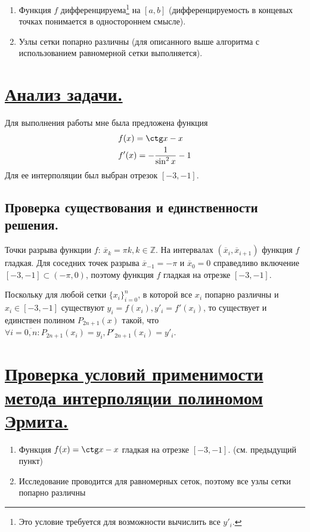 \documentclass[a4paper, 12pt]{article}
\begin{document}
	\begin{enumerate}
		\item Функция $f$ дифференцируема\footnote{Это условие требуется для возможности вычислить все $y'_i$.} на $[a,b]$ (дифференцируемость в концевых точках понимается в одностороннем смысле).
		\item Узлы сетки попарно различны (для описанного выше алгоритма с использованием равномерной сетки выполняется).
	\end{enumerate}

	\section{\underline{Анализ задачи.}}
	
	Для выполнения работы мне была предложена функция
	\begin{equation}
		\begin{aligned}
				&f(x)=\ctg x - x\\
			&f'(x)=-\frac{1}{\sin^2x}-1
		\end{aligned}
	\end{equation}
	Для ее интерполяции был выбран отрезок $[-3,-1]$.
	
	\subsection{Проверка существования и единственности решения.}
	
	Точки разрыва функции $f$: $\overline{x}_k=\pi k,k\in\mathbb{Z}$. На интервалах $(\overline{x}_{i}, \overline{x}_{i+1})$ функция $f$ гладкая. Для соседних точек разрыва $\overline{x}_{-1}=-\pi$ и $\overline{x}_{0}=0$ справедливо включение $[-3,-1]\subset(-\pi,0)$, поэтому функция $f$ гладкая на отрезке $[-3,-1]$.
	
	Поскольку для любой сетки $\{x_i\}_{i=0}^n$, в которой все $x_i$ попарно различны и $x_i\in[-3,-1]$ существуют $y_i=f(x_i), y'_i=f'(x_i)$, то существует и единствен полином $P_{2n+1}(x)$ такой, что $\forall i=\overline{0,n} : P_{2n+1}(x_i)=y_i, P'_{2n+1}(x_i) =y'_i$.
	
	\section{\underline{Проверка условий применимости метода интерполяции полиномом Эрмита.}}
	
	\begin{enumerate}
		\item Функция $f(x)=\ctg x - x$ гладкая на отрезке $[-3,-1]$. (см. предыдущий пункт)
		\item Исследование проводится для равномерных сеток, поэтому все узлы сетки попарно различны
	\end{enumerate}
	
\end{document}
